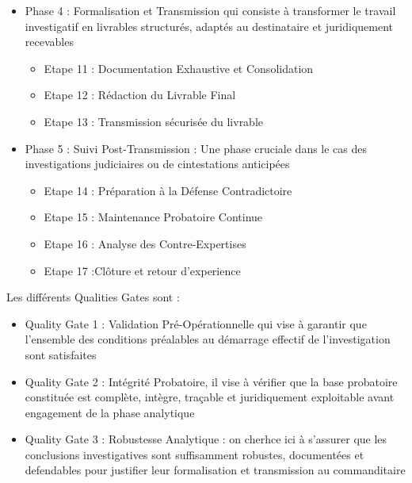 \documentclass[french]{article}
\begin{document}
\begin{itemize}
\item Phase 4 : Formalisation et Transmission qui consiste à transformer le travail investigatif en livrables structurés, adaptés au destinataire et juridiquement recevables
\begin{itemize}
    \item Etape 11 : Documentation Exhaustive et Consolidation
    \item Etape 12 : Rédaction du Livrable Final 
    \item Etape 13 : Transmission sécurisée du livrable
\end{itemize}
    \item Phase 5 : Suivi Post-Transmission : Une phase cruciale dans le cas des investigations judiciaires ou de cintestations anticipées
    \begin{itemize}
        \item Etape 14 : Préparation à la Défense Contradictoire
        \item Etape 15 : Maintenance Probatoire Continue
        \item Etape 16 : Analyse des Contre-Expertises
        \item Etape 17 :Clôture et retour d'experience
    \end{itemize}
\end{itemize}
Les différents Qualities Gates sont : 
\begin{itemize}
    \item Quality Gate 1 : Validation Pré-Opérationnelle qui vise à garantir que l'ensemble des conditions préalables au démarrage effectif de l'investigation sont satisfaites
    \item Quality Gate 2 : Intégrité Probatoire, il vise à vérifier que la base probatoire constituée est complète, intègre, traçable et juridiquement exploitable avant engagement de la phase analytique
    \item Quality Gate 3 : Robustesse Analytique : on cherhce ici à s'assurer que les conclusions investigatives sont suffisamment robustes, documentées et defendables pour justifier leur formalisation et transmission au commanditaire
\end{itemize}
\end{document}
